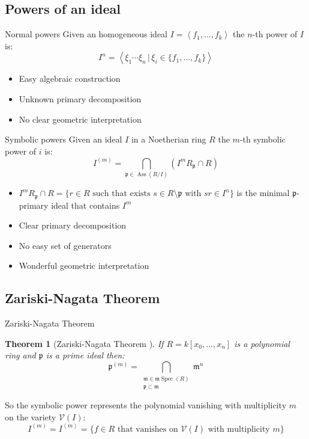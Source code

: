 \documentclass[dvipsnames]{beamer}
\theoremstyle{plain}
\newtheorem{teo}{Theorem}[section]
\theoremstyle{remark}
\theoremstyle{definition}
\newcommand{\p}{\mathfrak{p}}
\newcommand{\mm}{\mathfrak{m}}
\DeclareMathOperator{\Ass}{Ass}
\DeclareMathOperator{\Spec}{Spec}
\begin{document}
\subsection{Powers of an ideal}

\begin{frame}{Normal powers}
Given an homogeneous ideal $ I = \left\langle  f_1 , ... ,f_k \right\rangle  $ the $ n $-th power of $ I $ is: 
\[
 I^n = \left\langle \xi_1 \cdots \xi_n \,|\, \xi_i \in \{ f_1 , ... ,f_k \} \right\rangle 
\]
\pause
\begin{itemize}
\item Easy algebraic construction
\item Unknown primary decomposition %
\item No clear geometric interpretation 
\end{itemize}
\end{frame}

\begin{frame}{Symbolic powers}
Given an ideal $ I $ in a Noetherian ring $ R $ the $ m $-th symbolic power of $ i $ is:
\begin{equation*}\label{eq:sym_pow_def}
		I^{(m)} = \bigcap_{\p \in \Ass(R/I) } (I^m R_\p \cap R)
	\end{equation*}
\pause
\begin{itemize}
\item $ I^m R_\p \cap R = \{ r \in R \text{ such that exists } s \in R \setminus \p \text{ with } sr \in I^n\} $ is the minimal $ \p $-primary ideal that contains $ I^m $
\item Clear primary decomposition
\item No easy set of generators
\item Wonderful geometric interpretation
\end{itemize}
\end{frame}

\subsection{Zariski-Nagata Theorem}

\begin{frame}{Zariski-Nagata Theorem}
\begin{teo}[Zariski-Nagata Theorem \cite{Zar49, Nagata62}] \label{teo:zarnaga}
	If $ R = k[x_0 , ... , x_n] $ is a polynomial ring and $ \p $ is a prime ideal then:
	\begin{equation*}\label{eq:zar_nag_teo}
	\p^{(m)} = \bigcap_{\substack{ \mm \in \mm \Spec (R)\\ \p \subset \mm}} \mm ^n
	\end{equation*}
\end{teo}
\pause
So the symbolic power represents the polynomial vanishing with multiplicity $ m $ on the variety $ \mathcal{V}(I) $:
\begin{equation*}\label{eq:ideal_vanish}
	I^{(m)} = I^{\left<m\right>} = \{ f \in R \text{ that vanishes on } \mathcal{V}(I) \text{ with multiplicity } m\}
\end{equation*} 
\end{frame}
\end{document}
